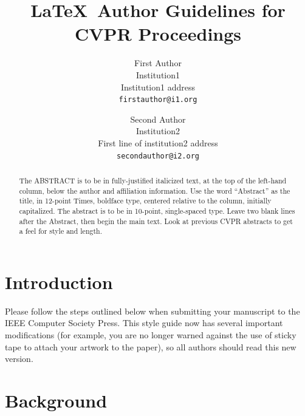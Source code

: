 \documentclass[10pt,twocolumn,letterpaper]{article}
\begin{document}
\title{\LaTeX\ Author Guidelines for CVPR Proceedings}

\author{First Author\\
Institution1\\
Institution1 address\\
{\tt\small firstauthor@i1.org}
\and
Second Author\\
Institution2\\
First line of institution2 address\\
{\tt\small secondauthor@i2.org}
}

\maketitle

\begin{abstract}
   The ABSTRACT is to be in fully-justified italicized text, at the top
   of the left-hand column, below the author and affiliation
   information. Use the word ``Abstract'' as the title, in 12-point
   Times, boldface type, centered relative to the column, initially
   capitalized. The abstract is to be in 10-point, single-spaced type.
   Leave two blank lines after the Abstract, then begin the main text.
   Look at previous CVPR abstracts to get a feel for style and length.
\end{abstract}

\section{Introduction}

Please follow the steps outlined below when submitting your manuscript to
the IEEE Computer Society Press.  This style guide now has several
important modifications (for example, you are no longer warned against the
use of sticky tape to attach your artwork to the paper), so all authors
should read this new version.


\section{Background}
\end{document}
